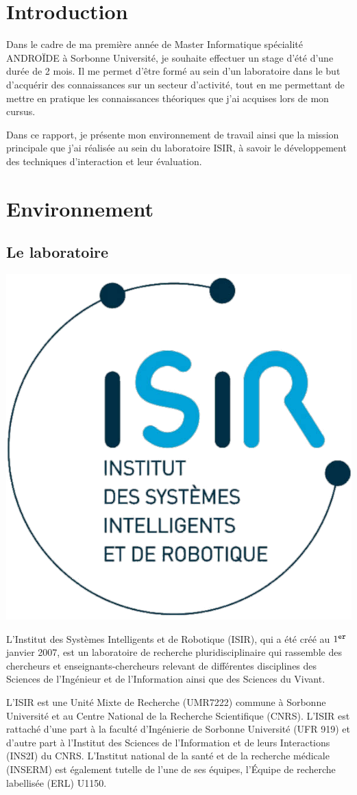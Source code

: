 \documentclass[12pt,a4paper]{article}
\begin{document}
\section{Introduction}
Dans le cadre de ma première année de Master Informatique spécialité ANDROÏDE à Sorbonne Université, je souhaite effectuer un stage d'été d'une durée de 2 mois. Il me permet d'être formé au sein d'un laboratoire dans le but d'acquérir des connaissances sur un secteur d'activité, tout en me permettant de mettre en pratique les connaissances théoriques que j'ai acquises lors de mon cursus.

Dans ce rapport, je présente mon environnement de travail ainsi que la mission principale que j'ai réalisée au sein du laboratoire ISIR, à savoir le développement des techniques d'interaction et leur évaluation.
\section{Environnement}
\subsection{Le laboratoire}
\begin{center}
	\includegraphics[width=.3\linewidth]{ISIR.png}
\end{center}

L'Institut des Systèmes Intelligents et de Robotique (ISIR), qui a été créé au $1^{\texttt{\footnotesize er}}$ janvier 2007, est un laboratoire de recherche pluridisciplinaire qui rassemble des chercheurs et enseignants-chercheurs relevant de différentes disciplines des Sciences de l’Ingénieur et de l’Information ainsi que des Sciences du Vivant.

L’ISIR est une Unité Mixte de Recherche (UMR7222) commune à Sorbonne Université et au Centre National de la Recherche Scientifique (CNRS). L'ISIR est rattaché d’une part à la faculté d’Ingénierie de Sorbonne Université (UFR 919) et d’autre part à l’Institut des Sciences de l'Information et de leurs Interactions (INS2I) du CNRS. L’Institut national de la santé et de la recherche médicale (INSERM) est également tutelle de l'une de ses équipes, l’Équipe de recherche labellisée (ERL) U1150.
\end{document}
